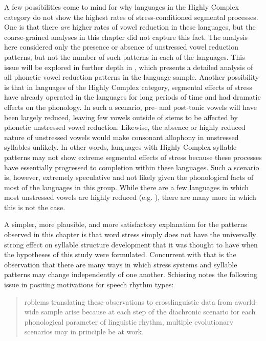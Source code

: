   A few possibilities come to mind for why languages in the Highly Complex category do not show the highest rates of stress-conditioned segmental processes. One is that there \textit{are} higher rates of vowel reduction in these languages, but the coarse-grained analyses in this chapter did not capture this fact. The analysis here considered only the presence or absence of unstressed vowel reduction patterns, but not the number of such patterns in each of the languages. This issue will be explored in further depth in , which presents a detailed analysis of all phonetic vowel reduction patterns in the language sample. Another possibility is that in languages of the Highly Complex category, segmental effects of stress have already operated in the languages for long periods of time and had dramatic effects on the phonology. In such a scenario, pre- and post-tonic vowels will have been largely reduced, leaving few vowels outside of stems to be affected by phonetic unstressed vowel reduction. Likewise, the absence or highly reduced nature of unstressed vowels would make consonant allophony in unstressed syllables unlikely. In other words, languages with Highly Complex syllable patterns may not show extreme segmental effects of stress because these processes have essentially progressed to completion within these languages. Such a scenario is, however, extremely speculative and not likely given the phonological facts of most of the languages in this group. While there are a few languages in which most unstressed vowels are highly reduced (e.g. ), there are many more in which this is not the case.

  A simpler, more plausible, and more satisfactory explanation for the patterns observed in this chapter is that word stress simply does not have the universally strong effect on syllable structure development that it was thought to have when the hypotheses of this study were formulated. Concurrent with that is the observation that there are many ways in which stress systems and syllable patterns may change independently of one another. Schiering notes the following issue in positing motivations for speech rhythm types:

\begin{quote}\relax
[P]roblems translating these observations to crosslinguistic data from a\linebreak world-wide sample arise because at each step of the diachronic scenario for each phonological parameter of linguistic rhythm, multiple evolutionary scenarios may in principle be at work. 
\citep[353]{Schiering2007}
\end{quote}

